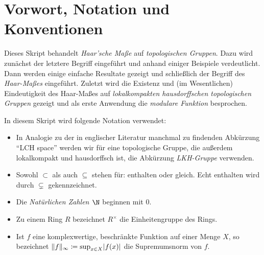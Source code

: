 
\chapter{Vorwort, Notation und Konventionen}
Dieses Skript behandelt \emph{Haar'sche Maße} auf \emph{topologischen Gruppen}.
Dazu wird zunächst der letztere Begriff eingeführt und anhand einiger Beispiele
verdeutlicht. Dann werden einige einfache Resultate gezeigt und schließlich der
Begriff des \emph{Haar-Maßes} eingeführt. Zuletzt wird die Existenz und
(im Wesentlichen) Eindeutigkeit des Haar-Maßes auf \emph{lokalkompakten
hausdorffschen topologischen Gruppen} gezeigt und als erste Anwendung die
\emph{modulare Funktion} besprochen.


\bigskip
In diesem Skript wird folgende Notation verwendet:
\begin{itemize}
    \item
        In Analogie zu der in englischer Literatur manchmal zu findenden
        Abkürzung \enquote{LCH space} werden wir für eine topologische Gruppe,
        die außerdem lokalkompakt und hausdorffsch ist, die Abkürzung
        \emph{LKH-Gruppe} verwenden.
        
    \item
        Sowohl $\subset$ als auch $\subseteq$ stehen für: enthalten oder gleich.
        Echt enthalten wird durch $\subsetneq$ gekennzeichnet.
    
    \item
        Die \emph{Natürlichen Zahlen $\N$} beginnen mit $0$.
    
    \item
        Zu einem Ring $R$ bezeichnet $R^\times$ die Einheitengruppe des Rings.
        
    \item
        Ist $f$ eine komplexwertige, beschränkte Funktion auf einer Menge $X$,
        so bezeichnet $\lVert f\rVert_\infty \coloneqq \sup_{x\in X} \lvert f(x) \rvert$ die
        Supremumsnorm von $f$.
\end{itemize}


